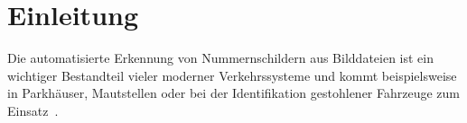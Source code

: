 \section{Einleitung}

Die automatisierte Erkennung von Nummernschildern aus Bilddateien
ist ein wichtiger Bestandteil vieler moderner Verkehrssysteme
und kommt beispielsweise in Parkh\"auser, Mautstellen
oder bei der Identifikation gestohlener Fahrzeuge zum
Einsatz~\cite{silva2018a}.
